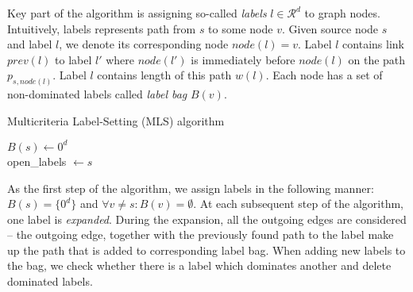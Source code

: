Key part of the algorithm is assigning so-called \emph{labels} $l\in \mathcal{R}^d$ to graph nodes.
Intuitively, labels represents path from $s$ to some node $v$.
Given source node $s$ and label $l$, we denote its corresponding node $node(l)=v$.
Label $l$ contains link $prev(l)$ to label $l'$ where $node(l')$ is immediately before $node(l)$ on the path $p_{s,node(l)}$.
Label $l$ contains length of this path $w(l)$.
Each node has a set of non-dominated labels called \emph{label bag} $B(v)$.

\vskip 5mm
\begin{algorithm}[H]
    \SetAlgoLined
    \LinesNumbered
    \caption{Multicriteria Label-Setting (MLS) algorithm}
    \label{MLSalg}
    $B(s) \leftarrow 0^d$ \\
    open\_labels $ \leftarrow s$ \\
    \vskip 5mm
\end{algorithm}
\vskip 5mm

As the first step of the algorithm, we assign labels in the following manner: $B(s)=\{0^d\}$ and $\forall v \ne s: B(v)=\emptyset$.
At each subsequent step of the algorithm, one label is \emph{expanded}. 
During the expansion, all the outgoing edges are considered -- the outgoing edge, together with the previously found path to the label make up the path that is added to corresponding label bag. 
When adding new labels to the bag, we check whether there is a label which dominates another and delete dominated labels.




